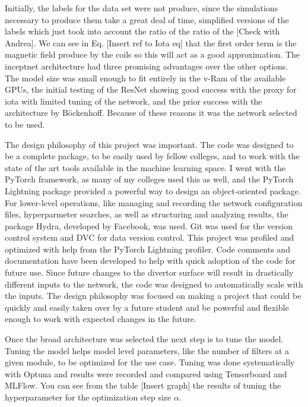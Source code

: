 Initially, the labels for the data set were not produce, since the simulations necessary to produce them take a great deal of time, simplified versions of the labels which just took into account the ratio of the ratio of the [Check with Andrea].
We can see in Eq. [Insert ref to Iota eq] that the first order term is the magnetic field produce by the coils so this will act as a good approximation.
The inceptnet architecture had three promising advantages over the other options.
The model size was small enough to fit entirely in the v-Ram of the available GPUs, the initial testing of the ResNet showing good success with the proxy for iota with limited tuning of the network, and the prior success with the architecture by Böckenhoff.
Because of these reasons it was the network selected to be used.


\label{sec:code:philosophy}
The design philosophy of this project was important. The code was designed to be a complete package, to be easily used by fellow colleges, and to work with the state of the art tools available in the machine learning space.
I went with the PyTorch framework, as many of my colleges used this as well, and the PyTorch Lightning package provided a powerful way to design an object-oriented package.
For lower-level operations, like managing and recording the network configuration files, hyperparmeter searches, as well as structuring and analyzing results, the package Hydra, developed by Facebook, was used.
Git was used for the version control system and DVC for data version control.
This project was profiled and optimized with help from the PyTorch Lightning profiler.
Code comments and documentation have been developed to help with quick adoption of the code for future use.
Since future changes to the divertor surface will result in drastically different inputs to the network, the code was designed to automatically scale with the inputs.
The design philosophy was focused on making a project that could be quickly and easily taken over by a future student and be powerful and flexible enough to work with expected changes in the future.



\label{sec:code:hyperparameters}

Once the broad architecture was selected the next step is to tune the model.
Tuning the model helps model level parameters, like the number of filters at a given module, to be optimized for the use case.
Tuning was done systematically with Optuna and results were recorded and compared using Tensorboard and MLFlow.
You can see from the table [Insert graph] the results of tuning the hyperparameter for the optimization step size $\alpha$.




